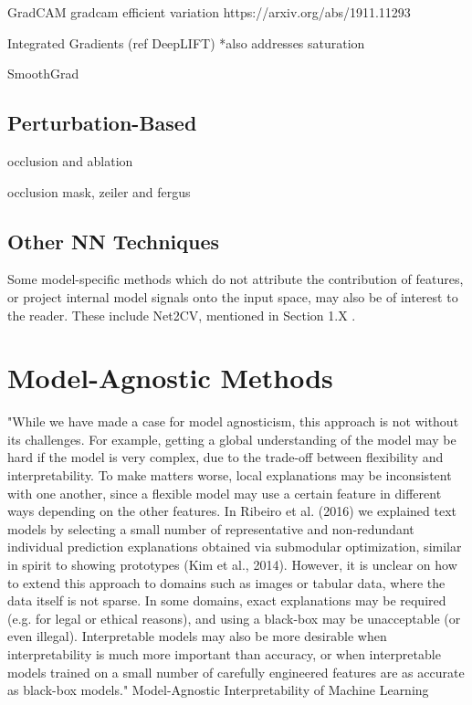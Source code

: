 \documentclass[main]{subfiles}
\begin{document}
GradCAM
gradcam efficient variation https://arxiv.org/abs/1911.11293





Integrated Gradients (ref DeepLIFT) *also addresses saturation

SmoothGrad



\subsection{Perturbation-Based}

occlusion and ablation

occlusion mask, zeiler and fergus


\subsection{Other NN Techniques}

Some model-specific methods which do not attribute the contribution of features, or project internal model signals onto the input space, may also be of interest to the reader. These include Net2CV, mentioned in Section 1.X .

\section{Model-Agnostic Methods}


"While we have made a case for model agnosticism, this
approach is not without its challenges. For example,
getting a global understanding of the model may be hard
if the model is very complex, due to the trade-off between
flexibility and interpretability. To make matters worse, local
explanations may be inconsistent with one another, since a
flexible model may use a certain feature in different ways
depending on the other features. In Ribeiro et al. (2016)
we explained text models by selecting a small number
of representative and non-redundant individual prediction
explanations obtained via submodular optimization, similar
in spirit to showing prototypes (Kim et al., 2014). However,
it is unclear on how to extend this approach to domains such
as images or tabular data, where the data itself is not sparse.
In some domains, exact explanations may be required (e.g.
for legal or ethical reasons), and using a black-box may
be unacceptable (or even illegal). Interpretable models
may also be more desirable when interpretability is much
more important than accuracy, or when interpretable models
trained on a small number of carefully engineered features
are as accurate as black-box models."  Model-Agnostic Interpretability of Machine Learning
\end{document}
